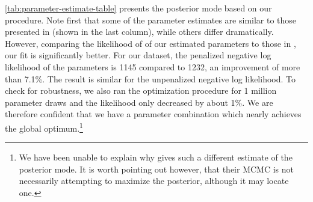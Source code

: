 \documentclass[11pt]{article}
\begin{document}
\autoref{tab:parameter-estimate-table} presents the posterior mode based
on our procedure. Note first that some of the parameter estimates are
similar to those presented in \citep{SmetsWouters2007} (shown in the
last column), while others differ dramatically. However, comparing the
likelihood of of our estimated parameters to those in
\citep{SmetsWouters2007}, our fit is significantly better. For our
dataset, the penalized negative log likelihood of the parameters is 1145
compared to 1232, an improvement of more than 7.1\%. The result is
similar for the unpenalized negative log likelihood. To check for
robustness, we also ran the optimization procedure for 1 million
parameter draws and the likelihood only decreased by about 1\%. We are
therefore confident that we have a parameter combination which nearly
achieves the global optimum.\footnote{We have been unable to explain why
  \citet{SmetsWouters2007} gives such a different estimate of the
  posterior mode. It is worth pointing out however, that their MCMC is
  not necessarily attempting to maximize the posterior, although it may
  locate one.}
\end{document}
